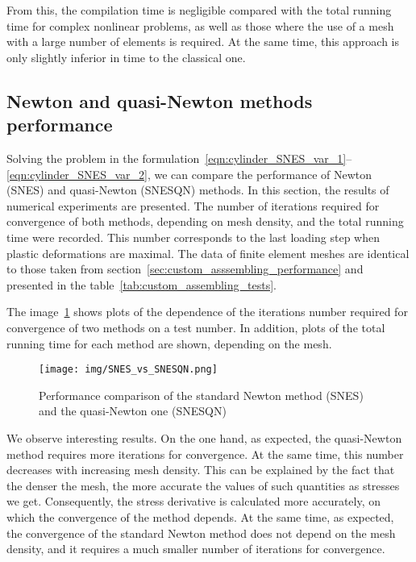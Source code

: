 \documentclass[12pt]{article}
\begin{document}
From this, the compilation time is negligible compared with the total running time for complex nonlinear problems, as well as those where the use of a mesh with a large number of elements is required. At the same time, this approach is only slightly inferior in time to the classical one.

\subsection{Newton and quasi-Newton methods performance}

Solving the problem in the formulation~\eqref{eqn:cylinder_SNES_var_1}--\eqref{eqn:cylinder_SNES_var_2}, we can compare the performance of Newton (SNES) and quasi-Newton (SNESQN) methods. In this section, the results of numerical experiments are presented. The number of iterations required for convergence of both methods, depending on mesh density, and the total running time were recorded. This number corresponds to the last loading step when plastic deformations are maximal. The data of finite element meshes are identical to those taken from section~\ref{sec:custom_asssembling_performance} and presented in the table~\ref{tab:custom_assembling_tests}.

The image~\ref{fig:SNES_vs_SNESQN} shows plots of the dependence of the iterations number required for convergence of two methods on a test number. In addition, plots of the total running time for each method are shown, depending on the mesh. 

\begin{figure}[H]
    \center
    \texttt{[image: img/SNES\_vs\_SNESQN.png]}
    \caption{Performance comparison of the standard Newton method (SNES) and the quasi-Newton one (SNESQN)}
    \label{fig:SNES_vs_SNESQN}
\end{figure}

We observe interesting results. On the one hand, as expected, the quasi-Newton method requires more iterations for convergence. At the same time, this number decreases with increasing mesh density. This can be explained by the fact that the denser the mesh, the more accurate the values of such quantities as stresses we get. Consequently, the stress derivative is calculated more accurately, on which the convergence of the method depends. At the same time, as expected, the convergence of the standard Newton method does not depend on the mesh density, and it requires a much smaller number of iterations for convergence. 
\end{document}
